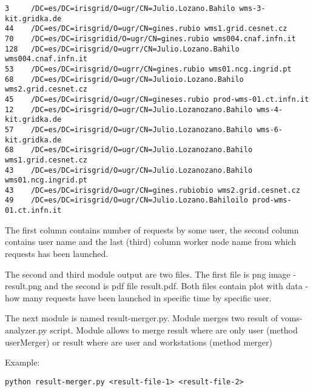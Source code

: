 \documentclass[a4paper, 11pt]{article} %
\begin{document}
\begin{verbatim}
3     /DC=es/DC=irisgrid/O=ugr/CN=Julio.Lozano.Bahilo wms-3-kit.gridka.de
44    /DC=es/DC=irisgrid/O=ugr/CN=gines.rubio wms1.grid.cesnet.cz
70    /DC=es/DC=irisgridid/O=ugr/CN=gines.rubio wms004.cnaf.infn.it
128   /DC=es/DC=irisgrid/O=ugrr/CN=Julio.Lozano.Bahilo wms004.cnaf.infn.it
53    /DC=es/DC=irisgrid/O=ugrr/CN=gines.rubio wms01.ncg.ingrid.pt
68    /DC=es/DC=irisgrid/O=ugr/CN=Julioio.Lozano.Bahilo wms2.grid.cesnet.cz
45    /DC=es/DC=irisgrid/O=ugr/CN=gineses.rubio prod-wms-01.ct.infn.it
12    /DC=es/DC=irisgrid/O=ugr/CN=Julio.Lozanozano.Bahilo wms-4-kit.gridka.de
57    /DC=es/DC=irisgrid/O=ugr/CN=Julio.Lozanozano.Bahilo wms-6-kit.gridka.de
68    /DC=es/DC=irisgrid/O=ugr/CN=Julio.Lozanozano.Bahilo wms1.grid.cesnet.cz
43    /DC=es/DC=irisgrid/O=ugr/CN=Julio.Lozanozano.Bahilo wms01.ncg.ingrid.pt
43    /DC=es/DC=irisgrid/O=ugr/CN=gines.rubiobio wms2.grid.cesnet.cz
49    /DC=es/DC=irisgrid/O=ugr/CN=Julio.Lozano.Bahiloilo prod-wms-01.ct.infn.it
\end{verbatim}

The first column contains number of requests by some user, the second column contains user name and the last (third) column worker node name from which requests has been launched.

The second and third module output are two files. The first file is png image - result.png and the second is pdf file result.pdf. Both files contain plot with data - how many requests have been launched in specific time by specific user.

The next module is named result-merger.py. Module merges two result of voms-analyzer.py script. Module allows to merge result where are only user (method userMerger) or result where are user and workstations (method merger)

Example:
\begin{verbatim}
python result-merger.py <result-file-1> <result-file-2>
\end{verbatim}



\end{document}
